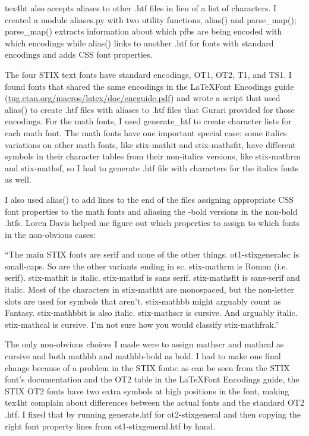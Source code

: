 \documentclass[12pt]{article}
\begin{document}

tex4ht also accepts aliases to other .htf files in lieu of a list of
characters.  I created a module aliases.py with two utility functions,
alias() and parse_map(); parse_map() extracts information about which pfbs
are being encoded with which encodings while alias() links to another
.htf for fonts with standard encodings and adds CSS font properties.  

The four STIX text fonts have standard encodings, OT1, OT2, T1, and
TS1.  I found fonts that shared the same encodings in the \LaTeX Font
Encodings guide (\url{tug.ctan.org/macros/latex/doc/encguide.pdf}) and
wrote a script that used alias() to create .htf files with aliases to
.htf files that Gurari provided for those encodings.  For the math
fonts, I used generate\_htf to create character lists for each math
font.  The math fonts have one important special case: some italics
variations on other math fonts, like stix-mathit and stix-mathsfit,
have different symbols in their character tables from their
non-italics versions, like stix-mathrm and stix-mathsf, so I had to
generate .htf file with characters for the italics fonts as well.

I also used alias() to add lines to the end of the files assigning
appropriate CSS font properties to the math fonts and aliasing the
-bold versions in the non-bold .htfs.  Loren Davis helped me figure
out which properties to assign to which fonts in the non-obvious
cases:

``The main STIX fonts are serif and none of the other things.
ot1-stixgeneralsc is small-caps.
So are the other variants ending in sc.
stix-mathrm is Roman (i.e. serif).
stix-mathit is italic.
stix-mathsf is sans serif.
stix-mathsfit is sans-serif and italic.
Most of the characters in stix-mathtt are monospaced, but the non-letter slots are used for symbols that aren't.
stix-mathbb might arguably count as Fantasy.
stix-mathbbit is also italic.
stix-mathscr is cursive.
And arguably italic.
stix-mathcal is cursive.
I'm not sure how you would classify stix-mathfrak.''

The only non-obvious choices I made were to assign mathscr and mathcal
as cursive and both mathbb and mathbb-bold as bold.  I had to make one
final change because of a problem in the STIX fonts: as can be seen
from the STIX font's documentation and the OT2 table in the \LaTeX Font
Encodings guide, the STIX OT2 fonts have two extra symbols at high
positions in the font, making tex4ht complain about differences
between the actual fonts and the standard OT2 .htf.  I fixed that by
running generate.htf for ot2-stixgeneral and then copying the right
font property lines from ot1-stixgeneral.htf by hand.
\end{document}
